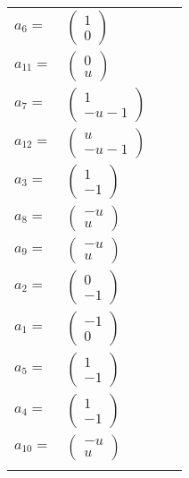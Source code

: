 \documentclass[1p]{elsarticle_modified}
\theoremstyle{definition}
\begin{document}
\begin{tabular}{m{7pt} m{180pt} m{7pt} m{180pt} }
\flushright $a_{6}=$&$\begin{pmatrix}1\\0\end{pmatrix}$ \\
\flushright $a_{11}=$&$\begin{pmatrix}0\\u\end{pmatrix}$ \\
\flushright $a_{7}=$&$\begin{pmatrix}1\\- u-1\end{pmatrix}$ \\
\flushright $a_{12}=$&$\begin{pmatrix}u\\- u-1\end{pmatrix}$ \\
\flushright $a_{3}=$&$\begin{pmatrix}1\\-1\end{pmatrix}$ \\
\flushright $a_{8}=$&$\begin{pmatrix}- u\\u\end{pmatrix}$ \\
\flushright $a_{9}=$&$\begin{pmatrix}- u\\u\end{pmatrix}$ \\
\flushright $a_{2}=$&$\begin{pmatrix}0\\-1\end{pmatrix}$ \\
\flushright $a_{1}=$&$\begin{pmatrix}-1\\0\end{pmatrix}$ \\
\flushright $a_{5}=$&$\begin{pmatrix}1\\-1\end{pmatrix}$ \\
\flushright $a_{4}=$&$\begin{pmatrix}1\\-1\end{pmatrix}$ \\
\flushright $a_{10}=$&$\begin{pmatrix}- u\\u\end{pmatrix}$\\&\end{tabular}
\end{document}
